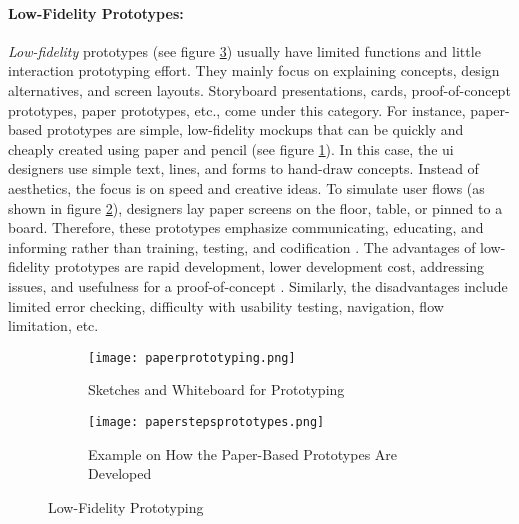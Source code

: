 \paragraph*{Low-Fidelity Prototypes:}
\textit{Low-fidelity} prototypes (see figure \ref{fig:background:lowfidelity}) usually have limited functions and little interaction prototyping effort. 
They mainly focus on explaining concepts, design alternatives, and screen layouts. 
Storyboard presentations, cards, proof-of-concept prototypes, paper prototypes, etc., come under this category.
For instance, paper-based prototypes are simple, low-fidelity mockups that can be quickly and cheaply created using paper and pencil (see figure \ref{fig:background:paperPrototyping}).
In this case, the \ac{ui} designers use simple text, lines, and forms to hand-draw concepts. 
Instead of aesthetics, the focus is on speed and creative ideas.
To simulate user flows (as shown in figure \ref{fig:background:paperprototypes}), designers lay paper screens on the floor, table, or pinned to a board.
Therefore, these prototypes emphasize communicating, educating, and informing rather than training, testing, and codification \cite{misc:prototyping:low}.
The advantages of low-fidelity prototypes are rapid development, lower development cost, addressing issues, and usefulness for a proof-of-concept \cite{article:prototyping:highlowfidelity}.
Similarly, the disadvantages include limited error checking, difficulty with usability testing, navigation, flow limitation, etc.
\begin{figure}[htbp!]
  \begin{subfigure}[b]{0.5\textwidth}
    \centering
    \texttt{[image: paperprototyping.png]}
    \caption{Sketches and Whiteboard for Prototyping}
    \label{fig:background:paperPrototyping}   
  \end{subfigure}             
  \begin{subfigure}[b]{0.5\textwidth}
    \centering
    \texttt{[image: paperstepsprototypes.png]}
    \caption[Paper-Based Prototypes]{Example on How the Paper-Based Prototypes Are Developed  \cite{misc:prototyping:uxpin}}
    \label{fig:background:paperprototypes}
  \end{subfigure}             
  \caption[Low-Fidelity Prototyping]{Low-Fidelity Prototyping}
  \label{fig:background:lowfidelity}
\end{figure}
